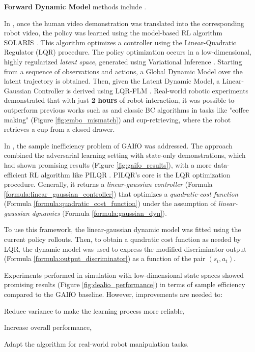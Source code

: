 

\textbf{Forward Dynamic Model} methods include \cite{smith2019avid,torabi2021dealio}.

In \cite{smith2019avid}, once the human video demonstration was translated into the corresponding robot video, the policy was learned using the model-based RL algorithm SOLARIS \cite{zhang2019solar}. This algorithm optimizes a controller using the Linear-Quadratic Regulator (LQR) procedure. The policy optimization occurs in a low-dimensional, highly regularized \textit{latent space}, generated using Variational Inference \cite{Kingma2014_vae}. Starting from a sequence of observations and actions, a Global Dynamic Model over the latent trajectory is obtained. Then, given the Latent Dynamic Model, a Linear-Gaussian Controller is derived using LQR-FLM \cite{levine2014lqr_flm}. Real-world robotic experiments demonstrated that with just \textbf{2 hours} of robot interaction, it was possible to outperform previous works such as \cite{sermanet2018time_contrastive,torabi2018bco} and classic BC algorithms in tasks like "coffee making" (Figure \ref{fig:embo_mismatch}) and cup-retrieving, where the robot retrieves a cup from a closed drawer.

In \cite{torabi2021dealio}, the sample inefficiency problem of GAIfO \cite{torabi2018gaifo} was addressed. The approach combined the adversarial learning setting with state-only demonstrations, which had shown promising results (Figure \ref{fig:gaifo_results}), with a more data-efficient RL algorithm like PILQR \cite{chebotar2017pilqr}. PILQR's core is the LQR optimization procedure. Generally, it returns a \textit{linear-gaussian controller} (Formula \ref{formula:linear_gaussian_controller}) that optimizes a \textit{quadratic-cost function} (Formula \ref{formula:quadratic_cost_function}) under the assumption of \textit{linear-gaussian dynamics} (Formula \ref{formula:gaussian_dyn}).



To use this framework, the linear-gaussian dynamic model was fitted using the current policy rollouts. Then, to obtain a quadratic cost function as needed by LQR, the dynamic model was used to express the modified discriminator output (Formula \ref{formula:output_discriminator}) as a function of the pair $(s_{t}, a_{t})$.



Experiments performed in simulation with low-dimensional state spaces showed promising results (Figure \ref{fig:dealio_performance}) in terms of sample efficiency compared to the GAIfO baseline. However, improvements are needed to:
\begin{enumerate*}[label=\textbf{(\arabic*)}]
    \item Reduce variance to make the learning process more reliable,
    \item Increase overall performance,
    \item Adapt the algorithm for real-world robot manipulation tasks.
\end{enumerate*}

